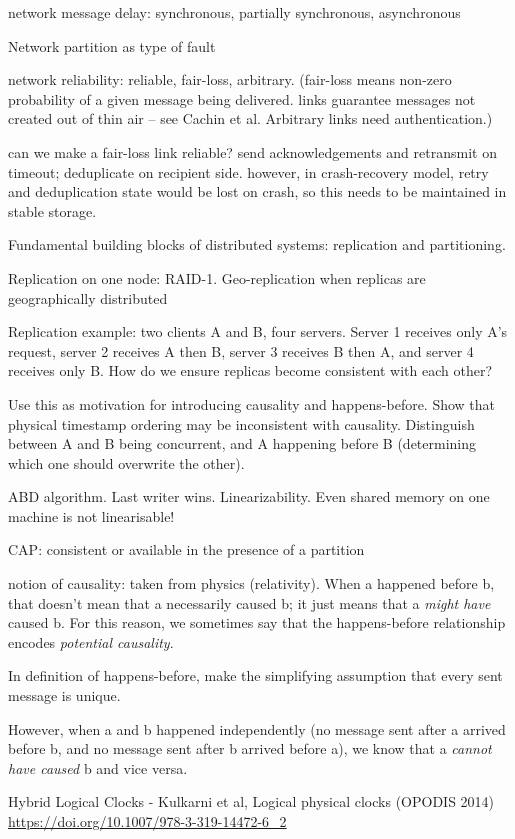 network message delay: synchronous, partially synchronous, asynchronous

Network partition as type of fault

network reliability: reliable, fair-loss, arbitrary. (fair-loss means non-zero probability of a
given message being delivered. links guarantee messages not created out of thin air -- see Cachin et al.
Arbitrary links need authentication.)

can we make a fair-loss link reliable? send acknowledgements and retransmit on timeout; deduplicate
on recipient side. however, in crash-recovery model, retry and deduplication state would be lost on
crash, so this needs to be maintained in stable storage.

Fundamental building blocks of distributed systems: replication and partitioning.

Replication on one node: RAID-1. Geo-replication when replicas are geographically distributed

Replication example: two clients A and B, four servers. Server 1 receives only A's request,
server 2 receives A then B, server 3 receives B then A, and server 4 receives only B.
How do we ensure replicas become consistent with each other?

Use this as motivation for introducing causality and happens-before.
Show that physical timestamp ordering may  be inconsistent with causality.
Distinguish between A and B being concurrent, and A happening before B
(determining which one should overwrite the other).

ABD algorithm. Last writer wins. Linearizability. Even shared memory on one machine is not linearisable!

CAP: consistent or available in the presence of a partition

notion of causality: taken from physics (relativity).
When a happened before b, that doesn't mean that a necessarily caused b; it just means that a \emph{might have} caused b.
For this reason, we sometimes say that the happens-before relationship encodes \emph{potential causality}.

In definition of happens-before, make the simplifying assumption that every sent message is unique.

However, when a and b happened independently (no message sent after a arrived before b, and no message sent after b arrived before a), we know that a \emph{cannot have caused} b and vice versa.

Hybrid Logical Clocks - Kulkarni et al, Logical physical clocks (OPODIS 2014) \url{https://doi.org/10.1007/978-3-319-14472-6_2}

